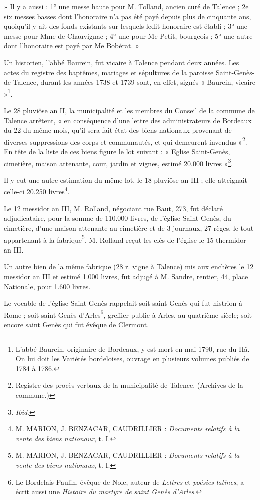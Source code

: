 » Il y a aussi : 1° une messe haute pour M. Tolland, ancien curé de Talence ; 2e six messes basses dont l'honoraire n'a pas été payé depuis plus de cinquante ans, quoiqu'il y ait des fonds existants sur lesquels ledit honoraire est établi ; 3° une messe pour Mme de Chauvignac ; 4° une pour Me Petit, bourgeois ; 5° une autre dont l'honoraire est payé par Me Bobérat. »

Un historien, l'abbé Baurein, fut vicaire à Talence pendant deux années. Les actes du registre des baptêmes, mariages et sépultures de la paroisse Saint-Genès-de-Talence, durant les années 1738 et 1739 sont, en effet, signés « Baurein, vicaire »\footnote{L'abbé Baurein, originaire de Bordeaux, y est mort en mai 1790, rue du Hâ. On lui doit les Variétés bordeloises, ouvrage en plusieurs volumes publiés de 1784 à 1786.}.

Le 28 pluviôse an II, la municipalité et les membres du Conseil de la commune de Talence arrêtent, « en conséquence d'une lettre des administrateurs de Bordeaux du 22 du même mois, qu'il sera fait état des biens nationaux provenant de diverses suppressions des corps et communautés, et qui demeurent invendus »\footnote{Registre des procès-verbaux de la municipalité de Talence. (Archives de la commune.)}. En tête de la liste de ces biens figure le lot suivant : « Eglise Saint-Genès, cimetière, maison attenante, cour, jardin et vignes, estimé 20.000 livres »\footnote{\textit{Ibid}.}.

Il y eut une autre estimation du même lot, le 18 pluviôse an III ; elle atteignait celle-ci 20.250 livres\footnote{M. MARION, J. BENZACAR, CAUDRILLIER : \textit{Documents relatifs à la vente des biens nationaux}, t. I\ier{}.}.

Le 12 messidor an III, M. Rolland, négociant rue Baut, 273, fut déclaré adjudicataire, pour la somme de 110.000 livres, de l'église Saint-Genès, du cimetière, d'une maison attenante au cimetière et de 3 journaux, 27 règes, le tout appartenant à la fabrique\footnote{M. MARION, J. BENZACAR, CAUDRILLIER : \textit{Documents relatifs à la vente des biens nationaux}, t. I\ier{}.}. M. Rolland reçut les clés de l'église le 15 thermidor an III.

Un autre bien de la même fabrique (28 r. vigne à Talence) mis aux enchères le 12 messidor an III et estimé 1.000 livres, fut adjugé à M. Sandre, rentier, 44, place Nationale, pour 1.600 livres.

Le vocable de l'église Saint-Genès rappelait soit saint Genès qui fut histrion à Rome ; soit saint Genès d'Arles\footnote{Le Bordelais Paulin, évêque de Nole, auteur de \textit{Lettres} et \textit{poésies latines}, a écrit aussi une \textit{Histoire du martyre de saint Genès d'Arles}.}, greffier public à Arles, au quatrième siècle; soit encore saint Genès qui fut évêque de Clermont.

